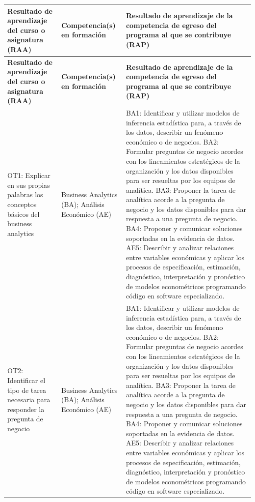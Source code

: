 \documentclass[11pt,a4paper]{article}
\begin{document}
\begin{longtable}{|p{5cm}|p{4cm}|p{6cm}|}
\hline
\textbf{Resultado de aprendizaje del curso o asignatura (RAA)} &
\textbf{Competencia(s) en formación} &
\textbf{Resultado de aprendizaje de la competencia de egreso del programa al que se contribuye (RAP)} \\
\hline
\endfirsthead

\hline
\textbf{Resultado de aprendizaje del curso o asignatura (RAA)} &
\textbf{Competencia(s) en formación} &
\textbf{Resultado de aprendizaje de la competencia de egreso del programa al que se contribuye (RAP)} \\
\hline
\endhead

OT1: Explicar en sus propias palabras los conceptos básicos del business analytics &
Business Analytics (BA); Análisis Económico (AE) &
BA1: Identificar y utilizar modelos de inferencia estadística para, a través de los datos, describir un fenómeno económico o de negocios.
BA2: Formular preguntas de negocio acordes con los lineamientos estratégicos de la organización y los datos disponibles para ser resueltas por los equipos de analítica.
BA3: Proponer la tarea de analítica acorde a la pregunta de negocio y los datos disponibles para dar respuesta a una pregunta de negocio.
BA4: Proponer y comunicar soluciones soportadas en la evidencia de datos.
AE5: Describir y analizar relaciones entre variables económicas y aplicar los procesos de especificación, estimación, diagnóstico, interpretación y pronóstico de modelos econométricos programando código en software especializado. \\
\hline

OT2: Identificar el tipo de tarea necesaria para responder la pregunta de negocio &
Business Analytics (BA); Análisis Económico (AE) &
BA1: Identificar y utilizar modelos de inferencia estadística para, a través de los datos, describir un fenómeno económico o de negocios.
BA2: Formular preguntas de negocio acordes con los lineamientos estratégicos de la organización y los datos disponibles para ser resueltas por los equipos de analítica.
BA3: Proponer la tarea de analítica acorde a la pregunta de negocio y los datos disponibles para dar respuesta a una pregunta de negocio.
BA4: Proponer y comunicar soluciones soportadas en la evidencia de datos.
AE5: Describir y analizar relaciones entre variables económicas y aplicar los procesos de especificación, estimación, diagnóstico, interpretación y pronóstico de modelos econométricos programando código en software especializado. \\
\hline


\end{longtable}
\end{document}

